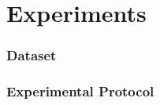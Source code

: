\documentclass[final,ignorenonframetext,compress]{beamer}
\begin{document}

    \section{Experiments}
    
    \begin{frame}
        \frametitle{Dataset}
    \end{frame}
    

    \begin{frame}
        \frametitle{Experimental Protocol}
    \end{frame}
\end{document}
